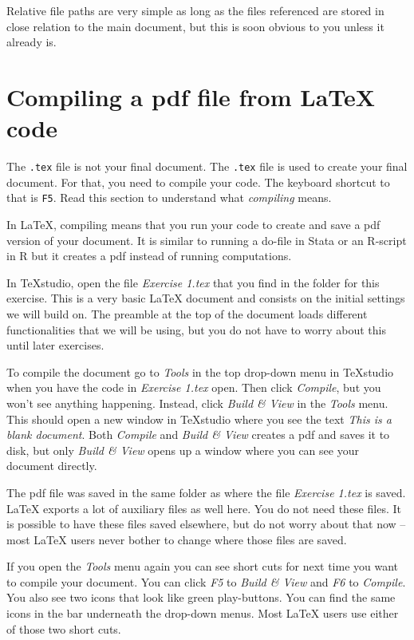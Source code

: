 \documentclass[12pts]{article}
\begin{document}
	Relative file paths are very simple as long as the files referenced are stored in close relation to the main document, but this is soon obvious to you unless it already is.
	
	\section{Compiling a pdf file from  {\LaTeX} code}
	
	\begin{tcolorbox}[colback=white,colframe=orange,title=\textbf{Read first}]
		The \texttt{.tex} file is not your final document. The \texttt{.tex} file is used to create your final document. For that, you need to compile your code. The keyboard shortcut to that is \texttt{F5}. Read this section to understand what \textit{compiling} means.
	\end{tcolorbox}
	
	In {\LaTeX}, compiling means that you run your code to create and save a pdf version of your document. It is similar to running a do-file in Stata or an R-script in R but it creates a pdf instead of running computations. 
	
	In TeXstudio, open the file \emph{Exercise 1.tex} that you find in the folder for this exercise. This is a very basic {\LaTeX} document and consists on the initial settings we will build on. The preamble at the top of the document loads different functionalities that we will be using, but you do not have to worry about this until later exercises.
	
	To compile the document go to \emph{Tools} in the top drop-down menu in TeXstudio when you have the code in \emph{Exercise 1.tex} open. Then click \emph{Compile}, but you won't see anything happening. Instead, click \emph{Build \& View} in the \emph{Tools} menu. This should open a new window in TeXstudio where you see the text \emph{This is a blank document}. Both \emph{Compile} and \emph{Build \& View} creates a pdf and saves it to disk, but only \emph{Build \& View} opens up a window where you can see your document directly. 
	
	The pdf file was saved in the same folder as where the file \emph{Exercise 1.tex} is saved. {\LaTeX} exports a lot of auxiliary files as well here. You do not need these files. It is possible to have these files saved elsewhere, but do not worry about that now -- most {\LaTeX} users never bother to change where those files are saved.
	
	If you open the \emph{Tools} menu again you can see short cuts for next time you want to compile your document. You can click \emph{F5} to \emph{Build \& View} and \emph{F6} to \emph{Compile}. You also see two icons that look like green play-buttons. You can find the same icons in the bar underneath the drop-down menus. Most {\LaTeX} users use either of those two short cuts.
	
\end{document}
